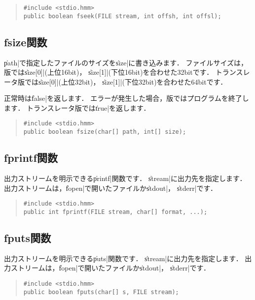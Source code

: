 \begin{quote}
\begin{verbatim}
#include <stdio.hmm>
public boolean fseek(FILE stream, int offsh, int offsl);
\end{verbatim}
\end{quote}

\subsection{fsize関数}

\|path|で指定したファイルのサイズを\|size|に書き込みます．
ファイルサイズは，
{\tacos}版では\|size[0]|(上位16bit)，
\|size[1]|(下位16bit)を合わせた32bitです．
トランスレータ版では\|size[0]|(上位32bit)，
\|size[1]|(下位32bit)を合わせた64bitです．

正常時は\|false|を返します．
エラーが発生した場合，{\tacos}版ではプログラムを終了します．
トランスレータ版では\|true|を返します．

\begin{quote}
\begin{verbatim}
#include <stdio.hmm>
public boolean fsize(char[] path, int[] size);
\end{verbatim}
\end{quote}

\subsection{fprintf関数}

出力ストリームを明示できる\|printf|関数です．
\|stream|に出力先を指定します．
出力ストリームは，\|fopen|で開いたファイルか\|stdout|，
\|stderr|です．

\begin{quote}
\begin{verbatim}
#include <stdio.hmm>
public int fprintf(FILE stream, char[] format, ...);
\end{verbatim}
\end{quote}

\subsection{fputs関数}

出力ストリームを明示できる\|puts|関数です．
\|stream|に出力先を指定します．
出力ストリームは，\|fopen|で開いたファイルか\|stdout|，
\|stderr|です．

\begin{quote}
\begin{verbatim}
#include <stdio.hmm>
public boolean fputs(char[] s, FILE stream);
\end{verbatim}
\end{quote}

